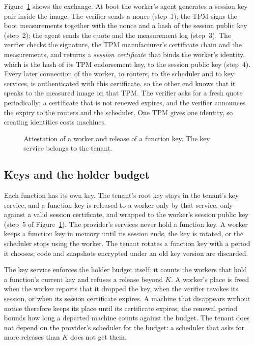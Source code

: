 Figure~\ref{fig:attest} shows the exchange. At boot the worker's agent generates a session key pair inside the image.
The verifier sends a nonce (step~1); the TPM signs the boot measurements together with the nonce and a hash of the
session public key (step~2); the agent sends the quote and the measurement log (step~3). The verifier checks the
signature, the TPM manufacturer's certificate chain and the measurements, and returns a \emph{session certificate}
that binds the worker's identity, which is the hash of its TPM endorsement key, to the session public key (step~4).
Every later connection of the worker, to routers, to the scheduler and to key services, is authenticated with this
certificate, so the other end knows that it speaks to the measured image on that TPM. The verifier asks for a fresh
quote periodically; a certificate that is not renewed expires, and the verifier announces the expiry to the routers
and the scheduler. One TPM gives one identity, so creating identities costs machines.

\begin{figure}[t]
\centering

\caption{Attestation of a worker and release of a function key. The key service belongs to the tenant.}
\label{fig:attest}
\end{figure}

\subsection{Keys and the holder budget}
\label{sec:keys}

Each function has its own key. The tenant's root key stays in the tenant's key service, and a function key is
released to a worker only by that service, only against a valid session certificate, and wrapped to the worker's
session public key (step~5 of Figure~\ref{fig:attest}). The provider's services never hold a function key.
A worker keeps a function key in memory until its session ends, the key is rotated, or the scheduler stops using the
worker. The tenant rotates a function key with a period it chooses; code and snapshots encrypted under an old key
version are discarded.

The key service enforces the holder budget itself: it counts the workers that hold a function's current key and
refuses a release beyond $K$. A worker's place is freed when the worker reports that it dropped the key, when the
verifier revokes its session, or when its session certificate expires. A machine that disappears without notice
therefore keeps its place until its certificate expires; the renewal period bounds how long a departed machine counts
against the budget. The tenant does not depend on the provider's scheduler for the budget: a scheduler that asks for
more releases than $K$ does not get them.

